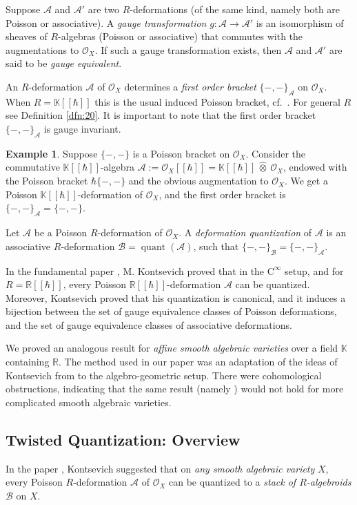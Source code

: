\documentclass[a4paper, 10pt]{amsart}
\theoremstyle{definition}
\newtheorem{exa}[equation]{Example}
\numberwithin{equation}{section}
\newcommand{\opn}{\operatorname}
\newcommand{\mcal}[1]{\mathcal{#1}}
\newcommand{\mrm}[1]{\mathrm{#1}}
\newcommand{\mbb}[1]{\mathbb{#1}}
\newcommand{\bsym}[1]{\boldsymbol{#1}}
\newcommand{\hatotimes}[1]{\, \what{{\otimes}}_{#1} \,}
\newcommand{\hot}{\hatotimes{}}
\newcommand{\what}[1]{\widehat{#1}}
\newcommand{\K}{\mbb{K}}
\newcommand{\R}{\mbb{R}}
\newcommand{\OO}{\mcal{O}}
\newcommand{\gerbe}[1]{\bsym{\mcal{#1}}}
\begin{document}
Suppose $\mcal{A}$ and $\mcal{A}'$ are two $R$-deformations (of the same kind,
namely both are Poisson or associative). A {\em gauge transformation} 
$g : \mcal{A} \to \mcal{A}'$ is an isomorphism of sheaves of $R$-algebras
(Poisson or associative) that commutes with the augmentations to $\mcal{O}_X$.
If such a gauge transformation exists, then $\mcal{A}$ and $\mcal{A}'$ are said
to be {\em gauge equivalent}.

An $R$-deformation $\mcal{A}$ of $\mcal{O}_X$ determines a {\em first order
bracket} $\{ -,- \}_{\mcal{A}}$ on $\mcal{O}_X$. 
When $R = \K[[\hbar]]$ this is the usual induced Poisson bracket,
cf.\ \cite{Ye1}. For general $R$ see Definition \ref{dfn:20}.
It is important to note that the  first order bracket $\{ -,- \}_{\mcal{A}}$
is gauge invariant. 

\begin{exa} \label{exa:23}
Suppose $\{ -,- \}$ is a Poisson bracket on $\mcal{O}_X$. Consider the
commutative $\K[[\hbar]]$-algebra 
$\mcal{A} := \mcal{O}_X[[\hbar]] = \K[[\hbar]] \hot \OO_X$, endowed
with the Poisson bracket $\hbar \{ -,- \}$ and the obvious augmentation to 
$\mcal{O}_X$. We get a Poisson $\K[[\hbar]]$-deformation of $\mcal{O}_X$, and
the first order bracket is 
$\{ -,- \}_{\mcal{A}} = \{ -,- \}$.
\end{exa}

Let $\mcal{A}$ be a Poisson $R$-deformation of $\mcal{O}_X$.
A {\em deformation quantization} of $\mcal{A}$ is an associative
$R$-deformation $\mcal{B} = \opn{quant}(\mcal{A})$, such that 
$\{ -,- \}_{\mcal{B}}  = \{ -,- \}_{\mcal{A}}$.

In the fundamental paper \cite{Ko1}, M. Kontsevich proved that in the
$\mrm{C}^{\infty}$ setup, and for $R = \R[[\hbar]]$, every Poisson
$\R[[\hbar]]$-deformation $\mcal{A}$ can be quantized.
Moreover, Kontsevich proved that his  quantization  is canonical, 
and it induces a bijection between the set of gauge
equivalence classes of Poisson deformations, and the set of gauge
equivalence classes of associative deformations.
 
We proved an analogous result for {\em affine smooth
algebraic varieties} over a field $\K$ containing $\R$.
The method used in our paper \cite{Ye1}
was an adaptation of the ideas of Kontsevich from \cite{Ko1} to the
algebro-geometric setup. There were cohomological obstructions, indicating that 
the same result (namely \cite[Theorem 0.1]{Ye1}) would not hold for more
complicated smooth algebraic varieties. 

\subsection{Twisted Quantization: Overview}
In the paper \cite{Ko2}, Kontsevich suggested that on {\em any smooth algebraic
variety} $X$, every Poisson $R$-deformation $\mcal{A}$ of $\mcal{O}_X$ can be
quantized to a {\em stack of $R$-algebroids} $\gerbe{B}$ on $X$. 
\end{document}
